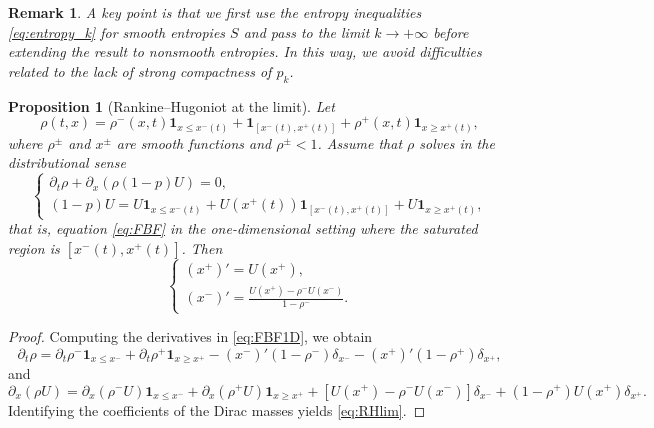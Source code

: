 \documentclass[11pt,twoside]{article}
\numberwithin{equation}{section}
\newtheorem{remark}[theorem]{Remark}
\newtheorem{proposition}[theorem]{Proposition}
\begin{document}
\begin{remark}
A key point is that we first use the entropy inequalities \eqref{eq:entropy_k} for smooth entropies $S$ and pass to the limit $k\to+\infty$ before extending the result to nonsmooth entropies. In this way, we avoid difficulties related to the lack of strong compactness of $p_k$.
\end{remark}

\begin{proposition}[Rankine–Hugoniot at the limit]
\label{thm:RH_infty}
Let
\[
\rho(t,x)
=\rho^-(x,t)\mathbf{1}_{x\le x^-(t)}
+\mathbf{1}_{[x^-(t),x^+(t)]}
+\rho^+(x,t)\mathbf{1}_{x\ge x^+(t)},
\]
where $\rho^\pm$ and $x^\pm$ are smooth functions and $\rho^\pm<1$.  
Assume that $\rho$ solves in the distributional sense
\begin{equation}
\label{eq:FBF1D}
\begin{cases}
\partial_t\rho+\partial_x(\rho(1-p)U)=0,\\
(1-p)U
=U\mathbf{1}_{x\le x^-(t)}
+U(x^+(t))\mathbf{1}_{[x^-(t),x^+(t)]}
+U\mathbf{1}_{x\ge x^+(t)},
\end{cases}
\end{equation}
that is, equation \eqref{eq:FBF} in the one-dimensional setting where the saturated region is $[x^-(t),x^+(t)]$. Then
\begin{equation}
\label{eq:RHlim}
\begin{cases}
(x^+)' = U(x^+),\\[0.2cm]
(x^-)' = \displaystyle\frac{U(x^+)-\rho^-U(x^-)}{1-\rho^-}.
\end{cases}
\end{equation}
\end{proposition}

\begin{proof}
Computing the derivatives in \eqref{eq:FBF1D}, we obtain
\[
\partial_t\rho
=\partial_t\rho^-\mathbf{1}_{x\le x^-}
+\partial_t\rho^+\mathbf{1}_{x\ge x^+}
-(x^-)'(1-\rho^-)\delta_{x^-}
-(x^+)'(1-\rho^+)\delta_{x^+},
\]
and
\[
\partial_x(\rho U)
=\partial_x(\rho^-U)\mathbf{1}_{x\le x^-}
+\partial_x(\rho^+U)\mathbf{1}_{x\ge x^+}
+[U(x^+)-\rho^-U(x^-)]\delta_{x^-}
+(1-\rho^+)U(x^+)\delta_{x^+}.
\]
Identifying the coefficients of the Dirac masses yields \eqref{eq:RHlim}.
\end{proof}
\end{document}
